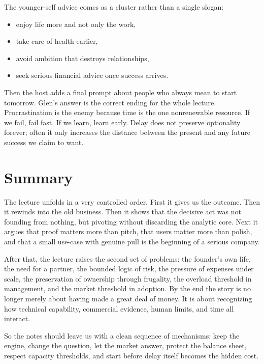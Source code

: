 The younger-self advice comes as a cluster rather than a single slogan:
\begin{itemize}
\item enjoy life more and not only the work,
\item take care of health earlier,
\item avoid ambition that destroys relationships,
\item seek serious financial advice once success arrives.
\end{itemize}

Then the host adds a final prompt about people who always mean to start tomorrow. Glen's answer is the correct ending for the whole lecture. Procrastination is the enemy because time is the one nonrenewable resource. If we fail, fail fast. If we learn, learn early. Delay does not preserve optionality forever; often it only increases the distance between the present and any future success we claim to want.

\section{Summary}

The lecture unfolds in a very controlled order. First it gives us the outcome. Then it rewinds into the old business. Then it shows that the decisive act was not founding from nothing, but pivoting without discarding the analytic core. Next it argues that proof matters more than pitch, that users matter more than polish, and that a small use-case with genuine pull is the beginning of a serious company.

After that, the lecture raises the second set of problems: the founder's own life, the need for a partner, the bounded logic of risk, the pressure of expenses under scale, the preservation of ownership through frugality, the overload threshold in management, and the market threshold in adoption. By the end the story is no longer merely about having made a great deal of money. It is about recognizing how technical capability, commercial evidence, human limits, and time all interact.

So the notes should leave us with a clean sequence of mechanisms: keep the engine, change the question, let the market answer, protect the balance sheet, respect capacity thresholds, and start before delay itself becomes the hidden cost.